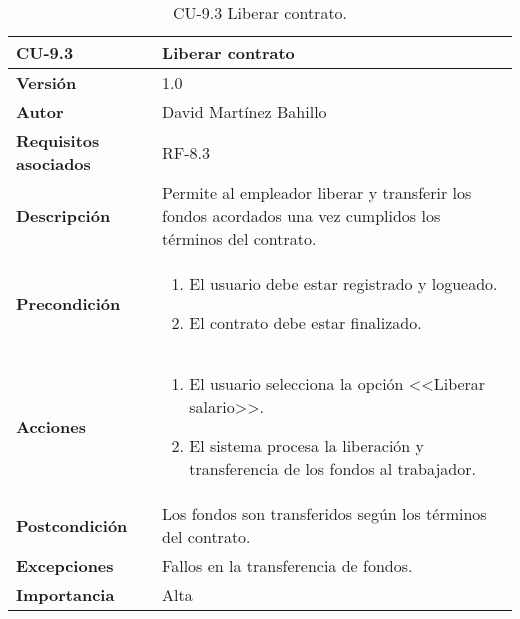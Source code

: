 \begin{table}[p]
	\centering
	\begin{tabularx}{\linewidth}{ p{} p{} }
		\toprule
		\textbf{CU-9.3}  & \textbf{Liberar contrato}\\
		\midrule
		\textbf{Versión}              & 1.0    \\
		\textbf{Autor}                & David Martínez Bahillo \\
		\textbf{Requisitos asociados} & RF-8.3 \\
		\textbf{Descripción}          & Permite al empleador liberar y transferir los fondos acordados una vez cumplidos los términos del contrato. \\
		\textbf{Precondición}         &  
		\begin{enumerate}
			\item El usuario debe estar registrado y logueado.
			\item El contrato debe estar finalizado.
		\end{enumerate}\\
		\textbf{Acciones}             &
		\begin{enumerate}
			\item El usuario selecciona la opción <<Liberar salario>>.
			\item El sistema procesa la liberación y transferencia de los fondos al trabajador.
		\end{enumerate}\\
		\textbf{Postcondición}        & Los fondos son transferidos según los términos del contrato. \\
		\textbf{Excepciones}          & Fallos en la transferencia de fondos. \\
		\textbf{Importancia}          & Alta \\
		\bottomrule
	\end{tabularx}
	\caption{CU-9.3 Liberar contrato.}
\end{table}


